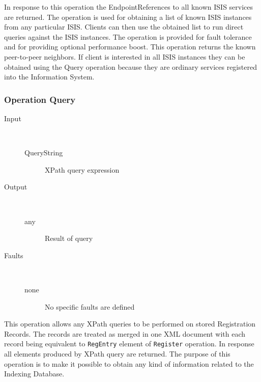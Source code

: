 \documentclass{book}
\begin{document}
In response to this operation the EndpointReferences to all known ISIS services are returned. The operation is used for obtaining a list of known ISIS instances from any particular ISIS. Clients can then use the obtained list to run direct queries against the ISIS instances. The operation is provided for fault tolerance and for providing optional performance boost. This operation returns the known peer-to-peer neighbors. If client is interested in all ISIS instances they can be obtained using the Query operation because they are ordinary services registered into the Information System.

\subsubsection{Operation Query}

\begin{description}

  \item[Input]~\begin{description}
    \item[QueryString] XPath query expression
  \end{description}

  \item[Output]~\begin{description}
    \item[any] Result of query
  \end{description}

  \item[Faults]~\begin{description}
    \item[none]No specific faults are defined
  \end{description}

\end{description}

This operation allows any XPath queries to be performed on stored Registration Records. The records are treated as merged in one XML document with each record being equivalent to \texttt{RegEntry} element of \texttt{Register} operation. In response all elements produced by XPath query are returned. The purpose of this operation is to make it possible to obtain any kind of information related to the Indexing Database.






\end{document}
